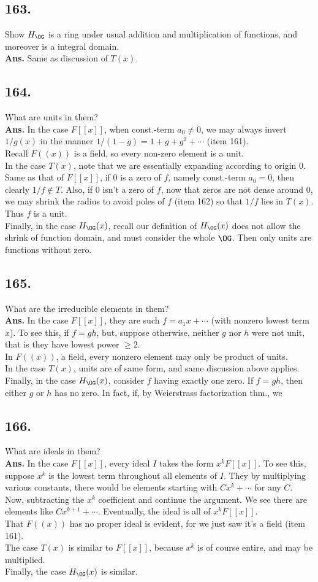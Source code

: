 \documentclass[12pt]{article}
\newcommand{\Ss}[1]{\textsf{\bfseries{#1}}}%
\newcommand{\Nl}{\\ \indent} %
\begin{document}
\subsection*{163.} Show \(H_\OG\) is a ring under usual addition and multiplication of functions, and moreover is a integral domain. \Nl
\Ss{Ans.} Same as discussion of \(T(x)\). 

\subsection*{164.} What are units in them? \Nl
\Ss{Ans.} In the case \(F[[x]]\), when const.-term \(a_0 \neq 0\), we may always invert \(1/g(x)\) in the manner \(1/(1-g) =1 +g +g^2 +\dotsb\) (item 161). \Nl
Recall \(F((x))\) is a field, so every non-zero element is a unit. \Nl
In the case \(T(x)\), note that we are essentially expanding according to origin 0. 
Same as that of \(F[[x]]\), if 0 is a zero of \(f\), namely const.-term \(a_0 =0\), then clearly \(1/f \notin T\). 
Also, if 0 isn't a zero of \(f\), now that zeros are not dense around 0, we may shrink the radius to avoid poles of \(f\) (item 162) so that \(1/f\) lies in \(T(x)\). 
Thus \(f\) is a unit. \Nl
Finally, in the case \(H_\OG(x)\), recall our definition of \(H_\OG(x)\) does not allow the shrink of function domain, and must consider the whole \(\OG\). 
Then only units are functions without zero.

\subsection*{165.} What are the irreducible elements in them? \Nl
\Ss{Ans.} In the case \(F[[x]]\), they are such \(f =a_1 x +\dotsb\) (with nonzero lowest term \(x\)). 
To see this, if \(f =gh\), but, suppose otherwise, neither \(g\) nor \(h\) were not unit, that is they have lowest power \(\geq 2\). \Nl
In \(F((x))\), a field, every nonzero element may only be product of units. \Nl
In the case \(T(x)\), units are of same form, and same discussion above applies. \Nl
Finally, in the case \(H_\OG(x)\), consider \(f\) having exactly one zero. 
If \(f =gh\), then either \(g\) or \(h\) has no zero. 
In fact, if, by Weierstrass factorization thm., we 

\subsection*{166.} What are ideals in them? \Nl
\Ss{Ans.} In the case \(F[[x]]\), every ideal \(I\) takes the form \(x^k F[[x]]\). 
To see this, suppose \(x^k\) is the lowest term throughout all elements of \(I\). 
They by multiplying various constants, there would be elements starting with \(Cx^k +\dotsb\) for any \(C\). 
Now, subtracting the \(x^k\) coefficient and continue the argument. We see there are elements like \(Cx^{k+1} +\dotsb\). 
Eventually, the ideal is all of \(x^k F[[x]]\). \Nl
That \(F((x))\) has no proper ideal is evident, for we just saw it's a field (item 161). \Nl
The case \(T(x)\) is similar to \(F[[x]]\), because \(x^k\) is of course entire, and may be multiplied. \Nl
Finally, the case \(H_\OG(x)\) is similar. 
\end{document}
